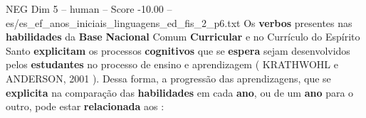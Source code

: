 \begin{textsample}{NEG Dim 5 – human – Score -10.00 – es/es\_ef\_anos\_iniciais\_linguagens\_ed\_fis\_2\_p6.txt}  \label{ex:f5_neg_009}
Os \textbf{verbos} presentes nas \textbf{habilidades} da \textbf{Base} \textbf{Nacional} Comum \textbf{Curricular} e no Currículo do Espírito Santo \textbf{explicitam} os processos \textbf{cognitivos} que se \textbf{espera} sejam desenvolvidos pelos \textbf{estudantes} no processo de ensino e aprendizagem ( KRATHWOHL e ANDERSON, 2001 ).
Dessa forma, a progressão das aprendizagens, que se \textbf{explicita} na comparação das \textbf{habilidades} em cada \textbf{ano}, ou de um \textbf{ano} para o outro, pode estar \textbf{relacionada} aos :

\end{textsample}
